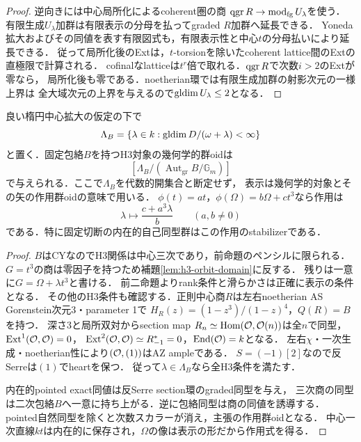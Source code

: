 \begin{proof}
逆向きには中心局所化によるcoherent圏の商
$\operatorname{qgr} R\to\operatorname{mod}_{\mathrm{fg}}U_\lambda$を使う．
有限生成$U_\lambda$加群は有限表示の分母を払ってgraded $R$加群へ延長できる．
Yoneda拡大およびその同値を表す有限図式も，有限表示性と中心$t$の分母払いにより延長できる．
従って局所化後のExtは，$t$-torsionを除いたcoherent lattice間のExtの直極限で計算される．
cofinalなlatticeは$t^r$倍で取れる．$\operatorname{qgr} R$で次数$i>2$のExtが零なら，
局所化後も零である．noetherian環では有限生成加群の射影次元の一様上界は
全大域次元の上界を与えるので$\operatorname{gldim} U_\lambda\le2$となる．
\end{proof}

\begin{theorem}
\label{thm:r13-exact-cut-reduction}
良い楕円中心拡大の仮定の下で
\[
 \Lambda_B=\{\lambda\in k:\operatorname{gldim} D/(\omega+\lambda)<\infty\}
\]
と置く．固定包絡$B$を持つH3対象の幾何学的群oidは
\[
 [\Lambda_B/(\operatorname{Aut}_{\mathrm{gr}}B/\mathbb G_m)]
\]
で与えられる．ここで$\Lambda_B$を代数的開集合と断定せず，
表示は幾何学的対象とその矢の作用群oidの意味で用いる．
$\phi(t)=a t$，$\phi(\Omega)=b\Omega+c t^3$なら作用は
\[
 \lambda\longmapsto\frac{c+a^3\lambda}{b}\qquad(a,b\ne0)
\]
である．特に固定切断の内在的自己同型群はこの作用のstabilizerである．
\end{theorem}
\begin{proof}
$B$はCYなのでH3関係は中心三次であり，前命題のペンシルに限られる．
$G=t^3$の商は零因子を持つため補題\ref{lem:h3-orbit-domain}に反する．
残りは一意に$G=\Omega+\lambda t^3$と書ける．
前二命題よりrank条件と滑らかさは正確に表示の条件となる．
その他のH3条件も確認する．正則中心商$R$は左右noetherian AS Gorenstein次元3・parameter 1で
$H_R(z)=(1-z^3)/(1-z)^4$，$Q(R)=B$を持つ．
深さ3と局所双対からsection map
$R_n\simeq\operatorname{Hom}(\mathcal O,\mathcal O(n))$は全$n$で同型，
$\operatorname{Ext}^1(\mathcal O,\mathcal O)=0$，
$\operatorname{Ext}^2(\mathcal O,\mathcal O)\simeq R_{-1}^*=0$，$\operatorname{End}(\mathcal O)=k$となる．
左右$\chi$・一次生成・noetherian性により$(\mathcal O,(1))$はAZ ampleである．
$S=(-1)[2]$なので反Serreは$(1)$でheartを保つ．
従って$\lambda\in\Lambda_B$なら全H3条件を満たす．

内在的pointed exact同値は反Serre section環のgraded同型を与え，
三次商の同型は二次包絡$B$へ一意に持ち上がる．逆に包絡同型は商の同値を誘導する．
pointed自然同型を除くと次数スカラーが消え，主張の作用群oidとなる．
中心一次直線$kt$は内在的に保存され，$\Omega$の像は表示の形だから作用式を得る．
\end{proof}

